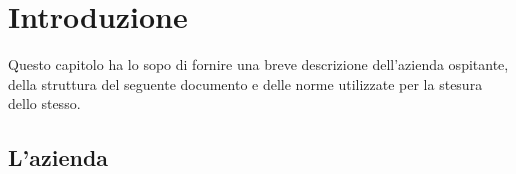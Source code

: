 
\chapter{Introduzione}
\label{cap:introduzione}

Questo capitolo ha lo sopo di fornire una breve descrizione dell'azienda ospitante, della struttura del seguente documento e delle norme utilizzate per la stesura dello stesso.\\





\section{L'azienda}

